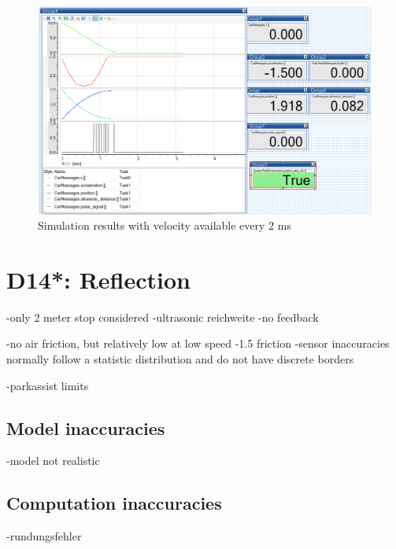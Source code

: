 \begin{figure}[H]
\centering
\includegraphics[width=1\textwidth]{images/V_2ms.png}
\caption{Simulation results with velocity available every 2 ms}
\label{fig:D13_V_2ms}
\end{figure}

\chapter{D14*: Reflection}\label{cha:D14}
-only 2 meter stop considered
-ultrasonic reichweite
-no feedback

-no air friction, but relatively low at low speed
-1.5 friction
-sensor inaccuracies normally follow a statistic distribution and do not have discrete borders

-parkassist limits

\section{Model inaccuracies}
-model not realistic
\section{Computation inaccuracies}
-rundungsfehler